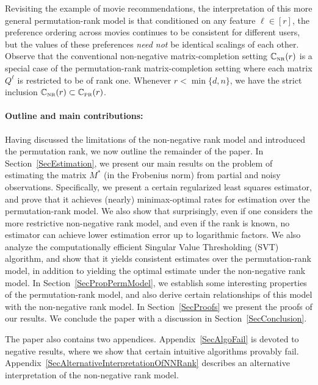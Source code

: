 \documentclass[11pt, hidelinks]{article} %
\newcommand{\arxiv}[1]{#1}
\newcommand{\nips}[1]{}
\newcommand{\numrows}{n}
\newcommand{\numcols}{d}
\newcommand{\wtmatrix}{M}
\newcommand{\wtstar}{\wtmatrix^*}
\newcommand{\matrixset}{\mathbb{C}}
\newcommand{\nnset}{\matrixset_{\mbox{\tiny NR}}}
\newcommand{\permset}{\matrixset_{\mbox{\tiny PR}}}
\newcommand{\nnrank}{r}
\newcommand{\rankonemx}[1]{Q^{#1}}
\begin{document}
Revisiting the example of movie recommendations, the interpretation of
this more general permutation-rank model is that conditioned on any
feature $\ell \in [\nnrank]$, the preference ordering across movies
continues to be consistent for different users, but the values of
these preferences \emph{need not} be identical scalings of each
other. Observe that the conventional non-negative matrix-completion
setting $\nnset(\nnrank)$ is a special case of the permutation-rank
matrix-completion setting where each matrix $\rankonemx{\ell}$ is
restricted to be of rank one. Whenever \mbox{$\nnrank <
  \min\{\numcols, \numrows\}$,} we have the strict inclusion
\mbox{$\nnset(\nnrank) \subset \permset(\nnrank)$.}


\paragraph*{Outline and main contributions:}

Having discussed the limitations of the non-negative rank model and
introduced the permutation rank, we now outline the remainder of the
paper. In Section~\ref{SecEstimation}, we present our main results on
the problem of estimating the matrix $\wtstar$ (in the Frobenius norm)
from partial and noisy observations. Specifically, we present a
certain regularized least squares estimator, and prove that it
achieves (nearly) minimax-optimal rates for estimation over the
permutation-rank model. We also show that surprisingly, even if one
considers the more restrictive non-negative rank model, and even if
the rank is known, no estimator can achieve lower estimation error up
to logarithmic factors. We also analyze the computationally efficient
Singular Value Thresholding (SVT) algorithm, and show that it yields
consistent estimates over the permutation-rank model, in addition to
yielding the optimal estimate under the non-negative rank model. In
Section~\ref{SecPropPermModel}, we establish some interesting
properties of the permutation-rank model, and also derive certain
relationships of this model with the non-negative rank
model. \arxiv{In Section~\ref{SecProofs} we present the proofs of our
  results.} We conclude the paper with a discussion in
Section~\ref{SecConclusion}.  \nips{ The proofs of our theoretical
  results are presented in the appendix.  }

\arxiv{ The paper also contains two
  appendices. Appendix~\ref{SecAlgoFail} is devoted to negative
  results, where we show that certain intuitive algorithms provably
  fail. Appendix~\ref{SecAlternativeInterpretationOfNNRank} describes
  an alternative interpretation of the non-negative rank model.  }
\end{document}
